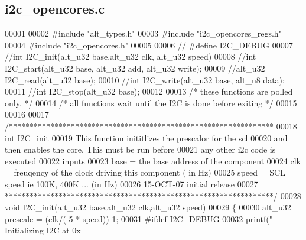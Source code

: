 \subsection{i2c\+\_\+opencores.\+c}
\label{ip_2i2c__opencores__v13_2HAL_2src_2i2c__opencores_8c_source}

\begin{DoxyCode}
00001 
00002 \textcolor{preprocessor}{#include "alt_types.h"}
00003 \textcolor{preprocessor}{#include "i2c\_opencores\_regs.h"}
00004 \textcolor{preprocessor}{#include "i2c\_opencores.h"}
00005 
00006 \textcolor{comment}{// #define I2C\_DEBUG}
00007 \textcolor{comment}{//int I2C\_init(alt\_u32 base,alt\_u32 clk, alt\_u32 speed)}
00008 \textcolor{comment}{//int I2C\_start(alt\_u32 base, alt\_u32 add, alt\_u32 write);}
00009 \textcolor{comment}{//alt\_u32 I2C\_read(alt\_u32 base);}
00010 \textcolor{comment}{//int I2C\_write(alt\_u32 base, alt\_u8 data);}
00011 \textcolor{comment}{//int I2C\_stop(alt\_u32 base);}
00012 
00013 \textcolor{comment}{/* these functions are polled only.  */}
00014 \textcolor{comment}{/* all functions wait until the I2C is done before exiting */}
00015 
00016 
00017 \textcolor{comment}{/****************************************************************}
00018 \textcolor{comment}{int I2C\_init}
00019 \textcolor{comment}{            This function inititlizes the prescalor for the scl}
00020 \textcolor{comment}{            and then enables the core. This must be run before}
00021 \textcolor{comment}{            any other i2c code is executed}
00022 \textcolor{comment}{inputs}
00023 \textcolor{comment}{      base = the base address of the component}
00024 \textcolor{comment}{      clk = freuqency of the clock driving this component  ( in Hz)}
00025 \textcolor{comment}{      speed = SCL speed ie 100K, 400K ...            (in Hz)}
00026 \textcolor{comment}{15-OCT-07 initial release}
00027 \textcolor{comment}{*****************************************************************/}
00028 \textcolor{keywordtype}{void} I2C_init(alt_u32 base,alt_u32 clk,alt_u32 speed)
00029 \{
00030   alt_u32 prescale = (clk/( 5 * speed))-1;
00031 \textcolor{preprocessor}{#ifdef  I2C\_DEBUG}
00032         printf(\textcolor{stringliteral}{" Initializing  I2C at 0x%
}
\end{DoxyCode}
